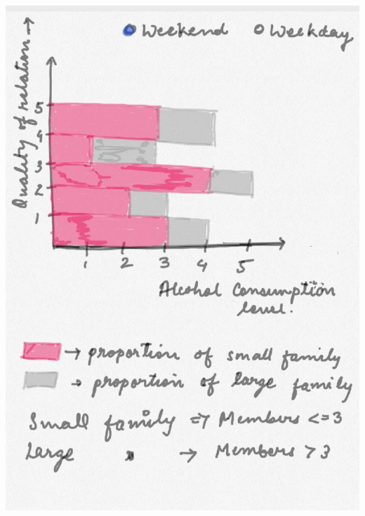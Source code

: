 \documentclass[titlepage, 12pt]{article}
\begin{document}
\begin{center}
\includegraphics[scale=0.3]{8}
\end{center}
\end{document}
